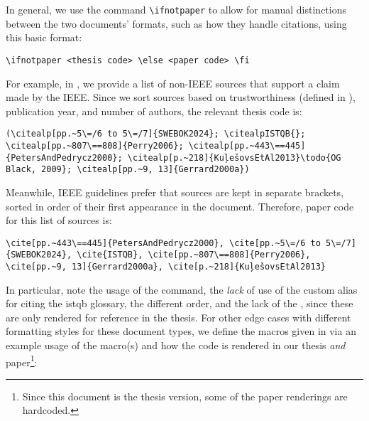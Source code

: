 In general, we use the command
\texttt{\textbackslash ifnotpaper} to allow for manual distinctions between the
two documents' formats, such as how they handle citations, using this basic format:
\begin{displayquote}
    \texttt{\textbackslash ifnotpaper <thesis code> \textbackslash else <paper code> \textbackslash fi}
\end{displayquote}
For example, in , we provide a list of non-IEEE sources
that support a claim made by the IEEE. Since we sort sources based on
trustworthiness (defined in ), publication year, and number of
authors, the relevant thesis code is:
\begin{displayquote}
    \texttt{(\textbackslash citealp[pp.\textasciitilde 5\textbackslash =/6 to 5\textbackslash =/7]\{SWEBOK2024\};
        \displayNL \textbackslash citealpISTQB\{\};
        \textbackslash citealp[pp.\textasciitilde 807\textbackslash ==808]\{Perry2006\};
        \displayNL \textbackslash citealp[pp.\textasciitilde 443\textbackslash ==445]\{PetersAndPedrycz2000\};
        \displayNL \textbackslash citealp[p.\textasciitilde 218]\{KuļešovsEtAl2013\}\textbackslash todo\{OG Black, 2009\};
        \displayNL \textbackslash citealp[pp.\textasciitilde 9, 13]\{Gerrard2000a\})}
\end{displayquote}
Meanwhile, IEEE guidelines prefer that sources are kept in separate brackets,
sorted in order of their first appearance in the document. Therefore, paper
code for this list of sources is:
\begin{displayquote}
    \texttt{\textbackslash cite[pp.\textasciitilde 443\textbackslash ==445]\{PetersAndPedrycz2000\},
        \displayNL \textbackslash cite[pp.\textasciitilde 5\textbackslash =/6 to 5\textbackslash =/7]\{SWEBOK2024\},
        \textbackslash cite\{ISTQB\},
        \displayNL \textbackslash cite[pp.\textasciitilde 807\textbackslash ==808]\{Perry2006\},
        \displayNL \textbackslash cite[pp.\textasciitilde 9, 13]\{Gerrard2000a\},
        \displayNL \textbackslash cite[p.\textasciitilde 218]\{KuļešovsEtAl2013\}}
\end{displayquote}
In particular, note the usage of the  command, the \emph{lack} of
use of the custom alias for citing the \acs{istqb} glossary, the different
order, and the lack of the , since these are only rendered for
reference in the thesis. For other edge cases with different formatting styles
for these document types, we define the macros given in 
via an example usage of the macro(s) and how the code is rendered in our thesis
\emph{and} paper\footnote{Since this document is the thesis version, some of
    the paper renderings are hardcoded.}:


